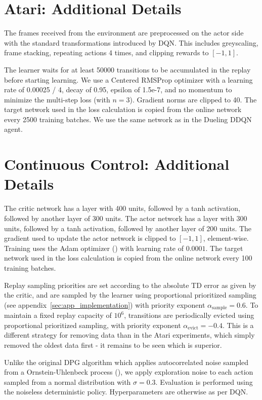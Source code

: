 \documentclass{article} %
\begin{document}
\section{Atari: Additional Details}
The frames received from the environment are preprocessed on the actor side with the standard transformations introduced by DQN. This includes greyscaling, frame stacking, repeating actions 4 times, and clipping rewards to $[-1, 1]$.

The learner waits for at least 50000 transitions to be accumulated in the replay before starting learning. We use a Centered RMSProp optimizer with a learning rate of 0.00025 / 4, decay of 0.95, epsilon of 1.5e-7, and no momentum to minimize the multi-step loss (with $n=3$). Gradient norms are clipped to 40. The target network used in the loss calculation is copied from the online network every 2500 training batches. We use the same network as in the Dueling DDQN agent.

\section{Continuous Control: Additional Details}

The critic network has a layer with 400 units, followed by a tanh activation, followed by another layer of 300 units. The actor network has a layer with 300 units, followed by a tanh activation, followed by another layer of 200 units. The gradient used to update the actor network is clipped to $[-1, 1]$, element-wise.  Training uses the Adam optimizer (\cite{kingma2014adam}) with learning rate of $0.0001$. The target network used in the loss calculation is copied from the online network every 100 training batches.

Replay sampling priorities are set according to the absolute TD error as given by the critic, and are sampled by the learner using proportional prioritized sampling (see appendix~\ref{sec:app_implementation}) with priority exponent $\alpha_{\mathrm{sample}} = 0.6$. To maintain a fixed replay capacity of $10^{6}$, transitions are periodically evicted using proportional prioritized sampling, with priority exponent $\alpha_{\mathrm{evict}} = -0.4$. This is a different strategy for removing data than in the Atari experiments, which simply removed the oldest data first - it remains to be seen which is superior.

Unlike the original DPG algorithm which applies autocorrelated noise sampled from a Ornstein-Uhlenbeck process (\cite{uhlenbeck1930theory}), we apply exploration noise to each action sampled from a normal distribution with $\sigma = 0.3$. Evaluation is performed using the noiseless deterministic policy. Hyperparameters are otherwise as per DQN.
\end{document}
